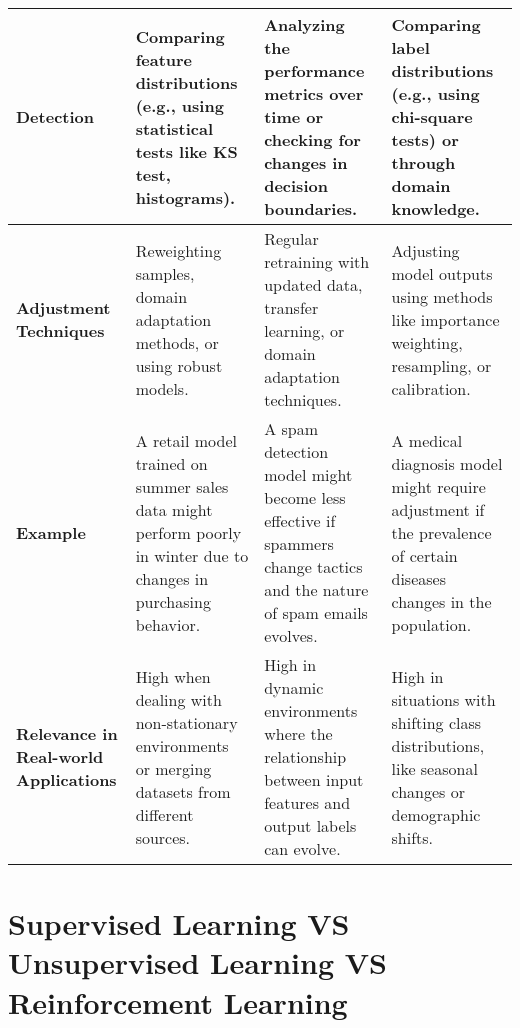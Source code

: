 \begin{longtable}{|m{2cm}|m{4.5cm}|m{4.5cm}|m{4.5cm}|}
    \textbf{Detection} & Comparing feature distributions (e.g., using statistical tests like KS test, histograms). & Analyzing the performance metrics over time or checking for changes in decision boundaries. & Comparing label distributions (e.g., using chi-square tests) or through domain knowledge. \\ \hline

    \textbf{Adjustment Techniques} & Reweighting samples, domain adaptation methods, or using robust models. & Regular retraining with updated data, transfer learning, or domain adaptation techniques. & Adjusting model outputs using methods like importance weighting, resampling, or calibration. \\ \hline

    \textbf{Example} & A retail model trained on summer sales data might perform poorly in winter due to changes in purchasing behavior. & A spam detection model might become less effective if spammers change tactics and the nature of spam emails evolves. & A medical diagnosis model might require adjustment if the prevalence of certain diseases changes in the population. \\ \hline

    \textbf{Relevance in Real-world Applications} & High when dealing with non-stationary environments or merging datasets from different sources. & High in dynamic environments where the relationship between input features and output labels can evolve. & High in situations with shifting class distributions, like seasonal changes or demographic shifts. \\ \hline

\end{longtable}


\section{Supervised Learning VS Unsupervised Learning VS Reinforcement Learning \cite{chatgpt,medium-numsmt2-rl-ch1-part-1}}\label{Supervised Learning VS Unsupervised Learning VS Reinforcement Learning}

